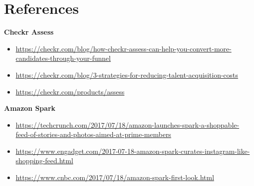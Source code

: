 \documentclass[letterpaper,11pt]{article}
\newcommand{\resumeSubHeadingListStart}{\begin{itemize}[leftmargin=0.15in, label={}]}
\newcommand{\resumeSubHeadingListEnd}{\end{itemize}}
\begin{document}
\section{References}
  \resumeSubHeadingListStart
    \small{
      \item{\textbf{Checkr Assess}
        \begin{itemize}\vspace{-5pt}
            \item \href{https://checkr.com/blog/how-checkr-assess-can-help-you-convert-more-candidates-through-your-funnel}{\color{blue}https://checkr.com/blog/how-checkr-assess-can-help-you-convert-more-candidates-through-your-funnel}
            \item \href{https://checkr.com/blog/3-strategies-for-reducing-talent-acquisition-costs}{\color{blue}https://checkr.com/blog/3-strategies-for-reducing-talent-acquisition-costs}
            \item \href{https://checkr.com/products/assess}{\color{blue}https://checkr.com/products/assess}
          \end{itemize}
      }
      \item{\textbf{Amazon Spark}
        \begin{itemize}\vspace{-5pt}
            \item \href{https://techcrunch.com/2017/07/18/amazon-launches-spark-a-shoppable-feed-of-stories-and-photos-aimed-at-prime-members}{\color{blue}https://techcrunch.com/2017/07/18/amazon-launches-spark-a-shoppable-feed-of-stories-and-photos-aimed-at-prime-members}
            \item \href{https://www.engadget.com/2017-07-18-amazon-spark-curates-instagram-like-shopping-feed.html}{\color{blue}https://www.engadget.com/2017-07-18-amazon-spark-curates-instagram-like-shopping-feed.html}
            \item \href{https://www.cnbc.com/2017/07/18/amazon-spark-first-look.html}{\color{blue}https://www.cnbc.com/2017/07/18/amazon-spark-first-look.html}
          \end{itemize}
      }
    }

  \resumeSubHeadingListEnd
\end{document}
